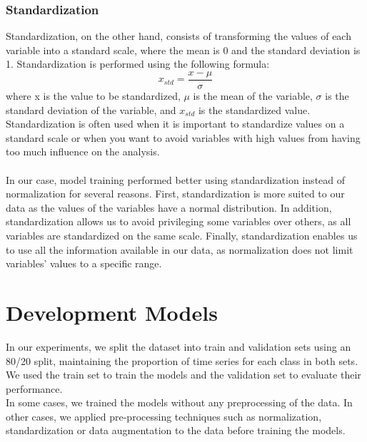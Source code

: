 \documentclass[11pt, oneside]{article}
\begin{document}
\subsubsection{Standardization}
Standardization, on the other hand, consists of transforming the values of each variable into a standard scale, where the mean is 0 and the standard deviation is 1. Standardization is performed using the following formula:
\[x_{std} = \frac{x - \mu}{\sigma} \]
where x is the value to be standardized, $\mu$ is the mean of the variable, $\sigma$ is the standard deviation of the variable, and $x_{std}$ is the standardized value.
Standardization is often used when it is important to standardize values on a standard scale or when you want to avoid variables with high values from having too much influence on the analysis.\\\\
In our case, model training performed better using standardization instead of normalization for several reasons. First, standardization is more suited to our data as the values of the variables have a normal distribution. In addition, standardization allows us to avoid privileging some variables over others, as all variables are standardized on the same scale. Finally, standardization enables us to use all the information available in our data, as normalization does not limit variables' values to a specific range.

\section{Development Models}
In our experiments, we split the dataset into train and validation sets using an 80/20 split, maintaining the proportion of time series for each class in both sets. We used the train set to train the models and the validation set to evaluate their performance.\\
In some cases, we trained the models without any preprocessing of the data. In other cases, we applied pre-processing techniques such as normalization, standardization or data augmentation to the data before training the models.
\end{document}
